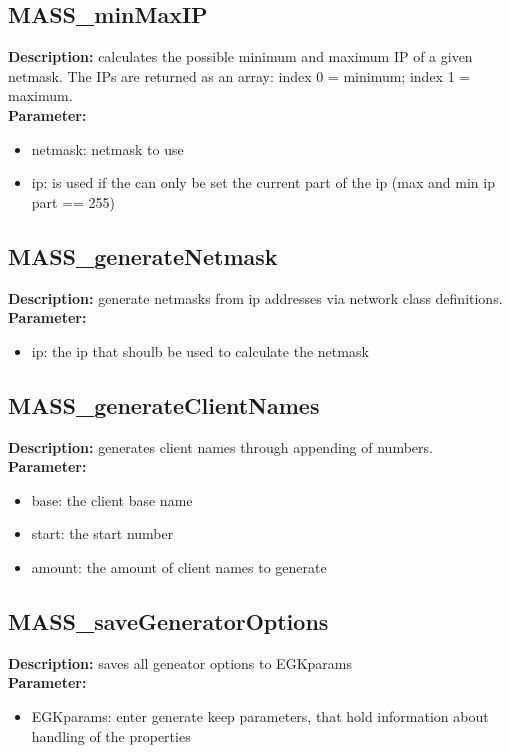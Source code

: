 \subsection{MASS\_minMaxIP}
\textbf{Description:} calculates the possible minimum and maximum IP of a given netmask. The IPs are returned as an array: index 0 = minimum; index 1 = maximum.\\
\textbf{Parameter:}
\begin{itemize}
\item netmask: netmask to use
\item ip: is used if the can only be set the current part of the ip (max and min ip part == 255)
\end{itemize}

\subsection{MASS\_generateNetmask}
\textbf{Description:} generate netmasks from ip addresses via network class definitions.\\
\textbf{Parameter:}
\begin{itemize}
\item ip: the ip that shoulb be used to calculate the netmask
\end{itemize}

\subsection{MASS\_generateClientNames}
\textbf{Description:} generates client names through appending of numbers.\\
\textbf{Parameter:}
\begin{itemize}
\item base: the client base name
\item start: the start number
\item amount: the amount of client names to generate
\end{itemize}

\subsection{MASS\_saveGeneratorOptions}
\textbf{Description:} saves all geneator options to EGKparams\\
\textbf{Parameter:}
\begin{itemize}
\item EGKparams: enter generate keep parameters, that hold information about handling of the properties
\end{itemize}


